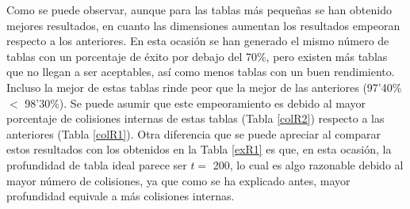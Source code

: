 \documentclass[12pt,spanish,listoffigures,listoftables,listofalgorithms]{tfgetsinf}
\begin{document}
\def\arraystretch{1.5}
\begin{table}[H]
	\centering
	\caption{Porcentajes de éxito para las tablas que emplean \textbf{R2}}
	\label{exR2}
\end{table}

Como se puede observar, aunque para las tablas más pequeñas se han obtenido mejores resultados, en cuanto las dimensiones aumentan los resultados empeoran respecto a los anteriores. En esta ocasión se han generado el mismo número de tablas con un porcentaje de éxito por debajo del 70\%, pero existen más tablas que no llegan a ser aceptables, así como menos tablas con un buen rendimiento. Incluso la mejor de estas tablas rinde peor que la mejor de las anteriores (97'40\% $<$ 98'30\%). Se puede asumir que este empeoramiento es debido al mayor porcentaje de colisiones internas de estas tablas (Tabla \ref{colR2}) respecto a las anteriores (Tabla \ref{colR1}). Otra diferencia que se puede apreciar al comparar estos resultados con los obtenidos en la Tabla \ref{exR1} es que, en esta ocasión, la profundidad de tabla ideal parece ser $t =$ 200, lo cual es algo razonable debido al mayor número de colisiones, ya que como se ha explicado antes, mayor profundidad equivale a más colisiones internas.
\end{document}
